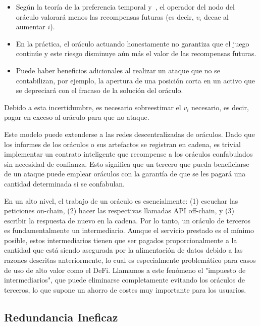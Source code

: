 \documentclass[11pt]{article}
\begin{document}
\begin{itemize}
    \item Según la teoría de la preferencia temporal y~\cite{frederick:2002}, el operador del nodo del oráculo valorará menos las recompensas futuras (es decir, $v_i$ decae al aumentar $i$).
    \item En la práctica, el oráculo actuando honestamente no garantiza que el juego continúe y este riesgo disminuye aún más el valor de las recompensas futuras.
    \item Puede haber beneficios adicionales al realizar un ataque que no se contabilizan, por ejemplo, la apertura de una posición corta en un activo que se depreciará con el fracaso de la solución del oráculo.
\end{itemize}

Debido a esta incertidumbre, es necesario sobreestimar el $v_i$ necesario, es decir, pagar en exceso al oráculo para que no ataque.

Este modelo puede extenderse a las redes descentralizadas de oráculos. Dado que los informes de los oráculos o sus artefactos se registran en cadena, es trivial implementar un contrato inteligente que recompense a los oráculos confabulados sin necesidad de confianza. Esto significa que un tercero que pueda beneficiarse de un ataque puede emplear oráculos con la garantía de que se les pagará una cantidad determinada si se confabulan.

En un alto nivel, el trabajo de un oráculo es esencialmente: (1) escuchar las peticiones on-chain, (2) hacer las respectivas llamadas API off-chain, y (3) escribir la respuesta de nuevo en la cadena. Por lo tanto, un oráculo de terceros es fundamentalmente un intermediario. Aunque el servicio prestado es el mínimo posible, estos intermediarios tienen que ser pagados proporcionalmente a la cantidad que está siendo asegurada por la alimentación de datos debido a las razones descritas anteriormente, lo cual es especialmente problemático para casos de uso de alto valor como el DeFi. Llamamos a este fenómeno el "impuesto de intermediarios", que puede eliminarse completamente evitando los oráculos de terceros, lo que supone un ahorro de costes muy importante para los usuarios.

\subsection{Redundancia Ineficaz}
\label{sec:ineffective-redundancy}
\end{document}
